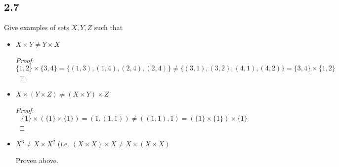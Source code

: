 \subsection*{2.7} Give examples of sets $X,Y, Z$ such that

\begin{itemize}
\item $X \times Y \neq Y \times X$
\begin{proof}
    $$\{1, 2\} \times \{3, 4\} = \{(1,3), (1,4), (2, 4), (2, 4)\} \neq \{(3,1), (3,2), (4, 1), (4,2)\} = \{3, 4\} \times \{1,2\}$$
\end{proof}

\item $X \times (Y \times Z) \neq (X \times Y) \times Z$

\begin{proof}
    $$ \{1\} \times (\{1\} \times \{1\}) = (1, (1, 1)) \neq ((1, 1), 1) = (\{1\} \times \{1\}) \times \{1\}$$
\end{proof}

\item $X^3 \neq X \times X^2$ (i.e. $(X \times X) \times X \neq X \times (X \times X)$

Proven above.

\end{itemize}

